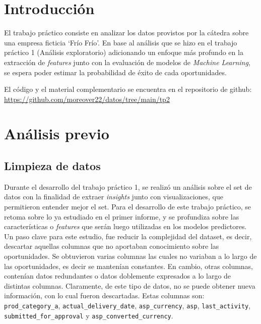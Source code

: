 \documentclass[titlepage,a4paper]{article}
\begin{document}
\tableofcontents %
\newpage
\section{Introducción}\label{sec:intro}
El trabajo práctico consiste en analizar los datos provistos por la cátedra sobre una empresa ficticia `Frío Frío'. En base al análisis que se hizo en el trabajo práctico 1 (Análisis exploratorio) \cite{tp_analisis_exploratorio} adicionando un enfoque más profundo en la extracción de \textit{features} junto con la evaluación de modelos de \textit{Machine Learning}, se espera poder estimar la probabilidad de éxito de cada oportunidades.

El código y el material complementario se encuentra en el repositorio de github: \url{https://github.com/moreover22/datos/tree/main/tp2}

\section{Análisis previo}\label{sec:analisis_prev}

\subsection{Limpieza de datos}\label{subsec:limpieza_datos}
Durante el desarrollo del trabajo práctico 1, se realizó un análisis sobre el set de datos con la finalidad de extraer \textit{insights} junto con visualizaciones, que permitieron entender mejor el set. Para el desarrollo de este trabajo práctico, se retoma sobre lo ya estudiado en el primer informe, y se profundiza sobre las características o \textit{features} que serán luego utilizadas en los modelos predictores. Un paso clave para este estudio, fue reducir la complejidad del dataset, es decir, descartar aquellas columnas que no aportaban conocimiento sobre las oportunidades. Se obtuvieron varias columnas las cuales no variaban a lo largo de las oportunidades, es decir se mantenían constantes. En cambio, otras columnas, contenían datos redundantes o datos doblemente expresados a lo largo de distintas columnas.  Claramente, de este tipo de datos, no se puede obtener nueva información, con lo cual fueron descartadas. Estas columnas son: \verb|prod_category_a|, \verb|actual_delivery_date|, \verb|asp_currency|, \verb|asp|, \verb|last_activity|, \verb|submitted_for_approval| y \verb|asp_converted_currency|.
\end{document}
